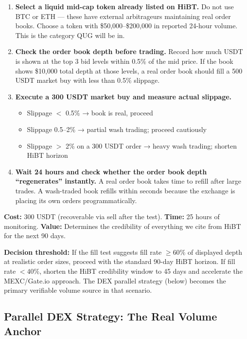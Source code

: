 \documentclass[11pt,a4paper]{article}
\begin{document}
\begin{enumerate}[leftmargin=1.5em]
  \item \textbf{Select a liquid mid-cap token already listed on HiBT.} Do not use BTC or ETH — these have external arbitrageurs maintaining real order books. Choose a token with \$50,000--\$200,000 in reported 24-hour volume. This is the category QUG will be in.

  \item \textbf{Check the order book depth before trading.} Record how much USDT is shown at the top 3 bid levels within 0.5\% of the mid price. If the book shows \$10,000 total depth at those levels, a real order book should fill a 500 USDT market buy with less than 0.5\% slippage.

  \item \textbf{Execute a 300 USDT market buy and measure actual slippage.}
    \begin{itemize}[leftmargin=1em]
      \item Slippage $<$ 0.5\% → book is real, proceed
      \item Slippage 0.5--2\% → partial wash trading; proceed cautiously
      \item Slippage $>$ 2\% on a 300 USDT order → heavy wash trading; shorten HiBT horizon
    \end{itemize}

  \item \textbf{Wait 24 hours and check whether the order book depth ``regenerates'' instantly.} A real order book takes time to refill after large trades. A wash-traded book refills within seconds because the exchange is placing its own orders programmatically.
\end{enumerate}

\textbf{Cost:} 300 USDT (recoverable via sell after the test). \textbf{Time:} 25 hours of monitoring. \textbf{Value:} Determines the credibility of everything we cite from HiBT for the next 90 days.

\textbf{Decision threshold:} If the fill test suggests fill rate $\geq 60\%$ of displayed depth at realistic order sizes, proceed with the standard 90-day HiBT horizon. If fill rate $< 40\%$, shorten the HiBT credibility window to 45 days and accelerate the MEXC/Gate.io approach. The DEX parallel strategy (below) becomes the primary verifiable volume source in that scenario.

\subsection{Parallel DEX Strategy: The Real Volume Anchor}
\end{document}
